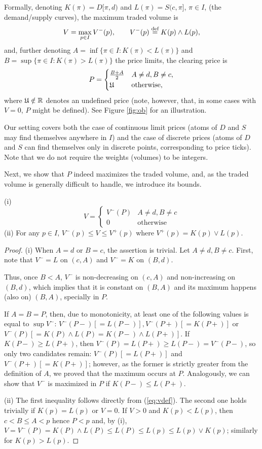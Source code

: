 \documentclass{aptpub}
\begin{document}
Formally, denoting $K(\pi)=D[\pi,d)$ and $L(\pi)=S(c,\pi]$, $\pi\in I$,
(the demand/supply curves), the maximum traded volume is 
\begin{equation}
V = \max_{p \in I} V^-(p),\qquad V^-(p) \stackrel{\text{def}}{=} K(p) \wedge L(p),
\label{eq:vdef}
\end{equation}
and, further denoting $A=\inf\{\pi\in I:K(\pi)<L(\pi)\}$ and $B=\sup\{\pi\in I:K(\pi)>L(\pi)\}$ 
the price limits,
the clearing price is 
$$P=\begin{cases}\frac{B+A}{2} & A \neq d, B \neq c,
\\\mathfrak{U} & \text{otherwise},
\end{cases}
$$
where $\mathfrak{U}\notin\mathbb{R}$ denotes an undefined price (note, however, that, in some cases with $V=0$, $P$ might be defined). See Figure \ref{fig:ob} for an illustration. 

Our setting covers both the case of continuous limit prices (atoms of $D$ and $S$ may find themselves anywhere in $I$) and the case of discrete prices (atoms of $D$ and $S$ can find themselves only in discrete points, corresponding to price ticks). Note that we do not require the weights (volumes) to be integers. 

Next, we show that $P$ indeed maximizes the traded volume, and, as the traded volume is generally difficult to handle, we introduce its bounds.

\begin{proposition}
(i) 
$$V=\begin{cases} V^-(P) & A \neq d, B \neq c
\\0 & \text{otherwise}
\end{cases}
$$
(ii) For any $p\in I$, $V^-(p) \leq V \leq V^+(p)$ where $V^+(p) = K(p) \vee L(p)$.
\end{proposition}

\begin{proof} (i) When $A = d$ or $B=c$, the assertion is trivial. Let $A \neq d, B \neq c$.
First, note that $V^- = L$ on $(c,A)$ and $V^- = K$ on $(B,d)$. 

Thus, once $B<A$, $V^-$ is non-decreasing on $(c,A)$ and non-increasing on $(B,d)$, which implies that it is constant on $(B,A)$ and  its maximum happens (also on) $(B,A)$, specially in $P$.


If $A=B=P$, then, due to monotonicity, at least one of the following values is equal to $\sup V^-$: $V^-(P-)[=L(P-)],V^-(P+)[=K(P+)]$ or 
$V^-(P)[=K(P) \wedge L(P)=K(P-) \wedge L(P+)]$.
If $K(P-) \geq L(P+)$, then $V^-(P)=L(P+)\geq L(P-)=V^-(P-)$, so only two candidates remain: $V^-(P)[=L(P+)]$ and  $V^-(P+)[=K(P+)]$; however, as the former is strictly greater from the definition of $A$, we proved that the maximum occurs at $P$. Analogously, we can show that $V^-$ is maximized in $P$ if $K(P-) \leq L(P+)$.

\noindent (ii) The first inequality follows directly from (\ref{eq:vdef}). The second one holds trivially if $K(p)=L(p)$ or $V=0$. If $V > 0$ and $K(p)<L(p)$, then $c < B \leq A < p$ hence $P < p$ and, by (i), $V=V^-(P)=K(P) \wedge L(P) \leq L(P) \leq L(p) \leq L(p) \vee K(p)$; similarly for $K(p)>L(p)$.
\end{proof}
\end{document}
